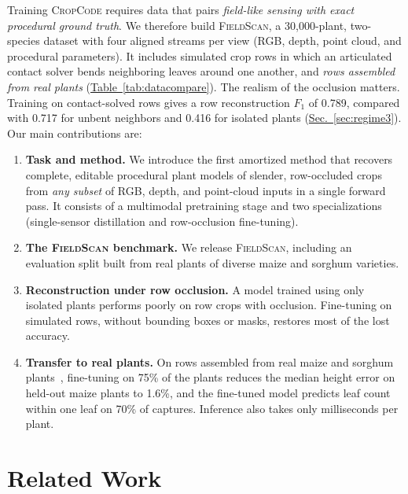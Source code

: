 \documentclass[10pt,twocolumn,letterpaper]{article}
\newcommand{\tabref}[1]{\hyperref[#1]{Table~\ref*{#1}}}
\newcommand{\secref}[1]{\hyperref[#1]{Sec.~\ref*{#1}}}
\newcommand{\method}{\textup{\textsc{CropCode}}}   %
\newcommand{\dataset}{\textup{\textsc{FieldScan}}}
\begin{document}
Training \method{} requires data that pairs \textit{field-like sensing with exact procedural ground truth}. We therefore build \dataset{}, a 30{,}000-plant, two-species dataset with four aligned streams per view (RGB, depth, point cloud, and procedural parameters). It includes simulated crop rows in which an articulated contact solver bends neighboring leaves around one another, and \textit{rows assembled from real plants} (\tabref{tab:datacompare}). The realism of the occlusion matters. Training on contact-solved rows gives a row reconstruction $F_1$ of 0.789, compared with 0.717 for unbent neighbors and 0.416 for isolated plants (\secref{sec:regime3}). Our main contributions are:
\begin{enumerate}
  \item \textbf{Task and method.} We introduce the first amortized method that recovers complete, editable procedural plant models of slender, row-occluded crops from \emph{any subset} of RGB, depth, and point-cloud inputs in a single forward pass. It consists of a multimodal pretraining stage and two specializations (single-sensor distillation and row-occlusion fine-tuning).
  \item \textbf{The \dataset{} benchmark.} We release \dataset{}, including an evaluation split built from real plants of diverse maize and sorghum varieties.
  \item \textbf{Reconstruction under row occlusion.} A model trained using only isolated plants performs poorly on row crops with occlusion. Fine-tuning on simulated rows, without bounding boxes or masks, restores most of the lost accuracy.
  \item \textbf{Transfer to real plants.} On rows assembled from real maize and sorghum plants~\citep{maizefield3d2025}, fine-tuning on 75\% of the plants reduces the median height error on held-out maize plants to 1.6\%, and the fine-tuned model predicts leaf count within one leaf on 70\% of captures. Inference also takes only milliseconds per plant.
\end{enumerate}

\section{Related Work}
\label{sec:related}
\end{document}

